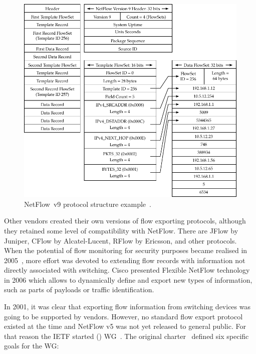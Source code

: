 \begin{figure}[t!]
  \begin{center}
    \includegraphics{figures/c02/nf9-protocol}
  \end{center}
  \caption{NetFlow~v9 protocol structure example~\cite{CiscoSystems-2007-NetFlow}.}
  \label{fig:nf9-protocol}
\end{figure}

Other vendors created their own versions of flow exporting protocols, although they retained some level of compatibility with NetFlow. There are JFlow by Juniper, CFlow by Alcatel-Lucent, RFlow by Ericsson, and other protocols. When the potential of flow monitoring for security purposes became realised in 2005~\cite{CiscoSystems-2005-Cisco}, more effort was devoted to extending flow records with information not directly associated with switching. Cisco presented Flexible NetFlow technology~\cite{CiscoSystems-2008-Cisco} in 2006 which allows to dynamically define and export new types of information, such as parts of payloads or traffic identification.

In 2001, it was clear that exporting flow information from switching devices was going to be supported by vendors. However, no standard flow export protocol existed at the time and NetFlow v5 was not yet released to general public. For that reason the IETF started  () WG~\cite{IETF--IP}. The original charter~\cite{IESG-2001-IP} defined six specific goals for the WG: 

